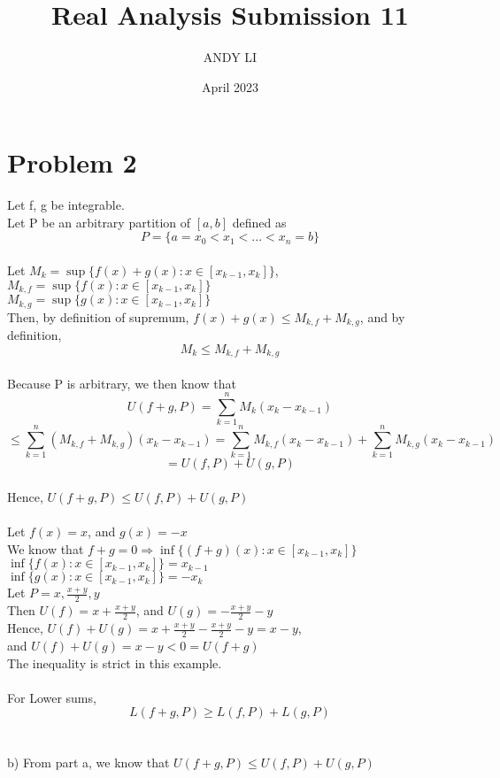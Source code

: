 \documentclass{article}
\title{Real Analysis Submission 11}
\author{ANDY LI}
\date{April 2023}
\begin{document}
\maketitle

\section*{Problem 2}
Let f, g be integrable.
\\Let P be an arbitrary partition of $[a, b]$ defined as $$P = \{a = x_0 < x_1 < ... < x_n = b\}$$
\\Let $M_k = \sup\{f(x)+g(x) : x \in [x_{k-1}, x_k]\}$,
\\$M_{k,f} = \sup\{f(x) : x \in [x_{k-1}, x_k]\}$
\\$M_{k,g} = \sup\{g(x) : x \in [x_{k-1}, x_k]\}$
\\Then, by definition of supremum, $f(x) + g(x) \leq M_{k,f} + M_{k, g}$, and by definition, $$M_k \leq M_{k,f} + M_{k, g}$$
\\Because P is arbitrary, we then know that $$U(f + g, P) = \sum_{k=1}^{n} M_k(x_k - x_{k-1})$$ $$\leq \sum_{k=1}^{n}(M_{k,f} + M_{k,g})(x_k - x_{k-1}) = \sum_{k=1}^n M_{k,f}(x_k - x_{k-1}) + \sum_{k=1}^n M_{k,g}(x_k - x_{k-1})$$
$$= U(f, P) + U(g, P)$$
\\Hence, $U(f + g, P) \leq U(f, P) + U(g, P)$
\\
\\Let $f(x) = x$, and $g(x) = -x$
\\We know that $f + g = 0 \Rightarrow \inf\{(f + g)(x) : x \in [x_{k-1}, x_k]\}$
\\$\inf\{f(x) : x \in [x_{k - 1}, x_k]\} = x_{k - 1}$
\\$\inf\{g(x) : x \in [x_{k - 1}, x_k]\} = -x_k$
\\Let $P = {x, \frac{x + y}{2}, y}$
\\Then $U(f) = x + \frac{x + y}{2}$, and $U(g) = -\frac{x + y}{2} - y$
\\Hence, $U(f) + U(g) = x + \frac{x + y}{2} -\frac{x+y}{2} - y = x - y$,
\\and $U(f) + U(g) = x - y < 0 = U(f + g)$
\\The inequality is strict in this example.
\\
\\For Lower sums, $$L(f + g, P) \geq L(f, P) + L(g, P)$$
\\
\\b) From part a, we know that $U(f + g, P) \leq U(f, P) + U(g, P)$
\end{document}
